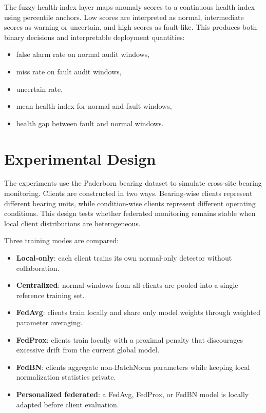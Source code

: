 \documentclass[11pt]{article}
\begin{document}
The fuzzy health-index layer maps anomaly scores to a continuous health index using percentile anchors. Low scores are interpreted as normal, intermediate scores as warning or uncertain, and high scores as fault-like. This produces both binary decisions and interpretable deployment quantities:

\begin{itemize}
    \item false alarm rate on normal audit windows,
    \item miss rate on fault audit windows,
    \item uncertain rate,
    \item mean health index for normal and fault windows,
    \item health gap between fault and normal windows.
\end{itemize}

\section{Experimental Design}

The experiments use the Paderborn bearing dataset to simulate cross-site bearing monitoring. Clients are constructed in two ways. Bearing-wise clients represent different bearing units, while condition-wise clients represent different operating conditions. This design tests whether federated monitoring remains stable when local client distributions are heterogeneous.

Three training modes are compared:

\begin{itemize}
    \item \textbf{Local-only}: each client trains its own normal-only detector without collaboration.
    \item \textbf{Centralized}: normal windows from all clients are pooled into a single reference training set.
    \item \textbf{FedAvg}: clients train locally and share only model weights through weighted parameter averaging.
    \item \textbf{FedProx}: clients train locally with a proximal penalty that discourages excessive drift from the current global model.
    \item \textbf{FedBN}: clients aggregate non-BatchNorm parameters while keeping local normalization statistics private.
    \item \textbf{Personalized federated}: a FedAvg, FedProx, or FedBN model is locally adapted before client evaluation.
\end{itemize}
\end{document}
